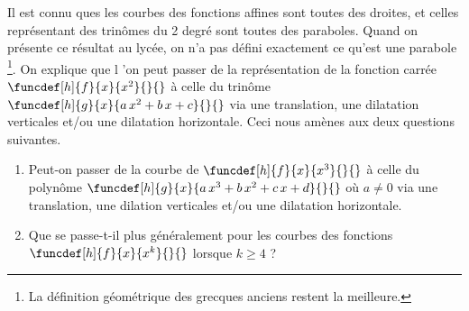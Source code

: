 Il est connu ques les courbes des fonctions affines sont toutes des droites, et celles représentant des trinômes du 2\ieme{} degré sont toutes des paraboles. Quand on présente ce résultat au lycée, on n'a pas défini exactement ce qu'est une parabole
\footnote{
	La définition géométrique des grecques anciens restent la meilleure.
}.
On explique que l 'on peut passer de la représentation de la fonction carrée
$\funcdef[h]{f}{x}{x^2}{}{}$
à celle du trinôme
$\funcdef[h]{g}{x}{a \, x^2 + b \, x + c}{}{}$
via une translation, une dilatation verticales et/ou une dilatation horizontale.
Ceci nous amènes aux deux questions suivantes.
\begin{enumerate}	
	\item Peut-on passer de la courbe de
	      $\funcdef[h]{f}{x}{x^3}{}{}$
		  à celle du polynôme
		  $\funcdef[h]{g}{x}{a \, x^3 + b \, x^2 + c \, x + d}{}{}$
		  où $a\neq 0$
		  via une translation, une dilation verticales et/ou une dilatation horizontale.

	\item Que se passe-t-il plus généralement pour les courbes des fonctions
	      $\funcdef[h]{f}{x}{x^k}{}{}$
		  lorsque $k \geq 4$ ?
\end{enumerate}

 